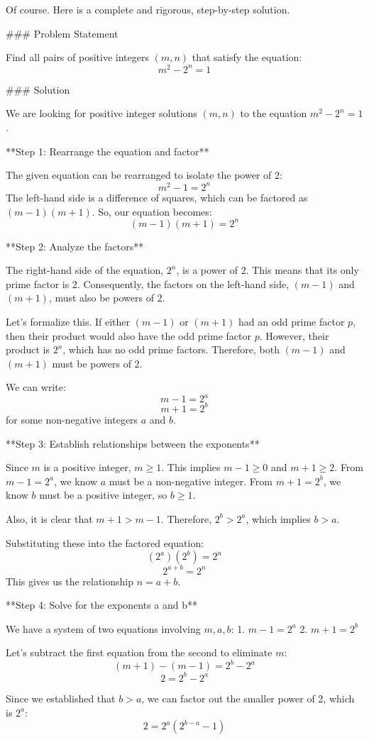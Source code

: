 Of course. Here is a complete and rigorous, step-by-step solution.

### Problem Statement

Find all pairs of positive integers $(m, n)$ that satisfy the equation:
$$m^2 - 2^n = 1$$

### Solution

We are looking for positive integer solutions $(m, n)$ to the equation $m^2 - 2^n = 1$.

**Step 1: Rearrange the equation and factor**

The given equation can be rearranged to isolate the power of 2:
$$m^2 - 1 = 2^n$$
The left-hand side is a difference of squares, which can be factored as $(m-1)(m+1)$.
So, our equation becomes:
$$(m-1)(m+1) = 2^n$$

**Step 2: Analyze the factors**

The right-hand side of the equation, $2^n$, is a power of 2. This means that its only prime factor is 2. Consequently, the factors on the left-hand side, $(m-1)$ and $(m+1)$, must also be powers of 2.

Let's formalize this. If either $(m-1)$ or $(m+1)$ had an odd prime factor $p$, then their product would also have the odd prime factor $p$. However, their product is $2^n$, which has no odd prime factors. Therefore, both $(m-1)$ and $(m+1)$ must be powers of 2.

We can write:
$$m-1 = 2^a$$
$$m+1 = 2^b$$
for some non-negative integers $a$ and $b$.

**Step 3: Establish relationships between the exponents**

Since $m$ is a positive integer, $m \ge 1$.
This implies $m-1 \ge 0$ and $m+1 \ge 2$.
From $m-1 = 2^a$, we know $a$ must be a non-negative integer.
From $m+1 = 2^b$, we know $b$ must be a positive integer, so $b \ge 1$.

Also, it is clear that $m+1 > m-1$. Therefore, $2^b > 2^a$, which implies $b > a$.

Substituting these into the factored equation:
$$(2^a)(2^b) = 2^n$$
$$2^{a+b} = 2^n$$
This gives us the relationship $n = a+b$.

**Step 4: Solve for the exponents a and b**

We have a system of two equations involving $m, a, b$:
1. $m-1 = 2^a$
2. $m+1 = 2^b$

Let's subtract the first equation from the second to eliminate $m$:
$$(m+1) - (m-1) = 2^b - 2^a$$
$$2 = 2^b - 2^a$$

Since we established that $b > a$, we can factor out the smaller power of 2, which is $2^a$:
$$2 = 2^a(2^{b-a} - 1)$$

